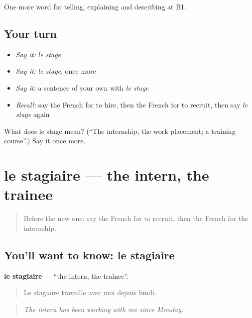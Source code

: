 \begin{grammarlens}[title={What you've built}]
One more word for telling, explaining and describing at B1.
\end{grammarlens}

\subsection*{Your turn}
\begin{itemize}
\raggedright
  \item \emph{Say it:} \emph{le stage}
  \item \emph{Say it:} \emph{le stage}, once more
  \item \emph{Say it:} a sentence of your own with \emph{le stage}
  \item \emph{Recall:} say the French for to hire, then the French for to recruit, then say \emph{le stage} again
\end{itemize}

\begin{tcolorbox}[breakable,colback=teal!4,colframe=teal!35!black,title={Before you move on}]
What does le stage mean? (\textquotedblleft{}The internship, the work placement; a training course\textquotedblright{}.) Say it once more.
\end{tcolorbox}
\section[le stagiaire]{le stagiaire — the intern, the trainee}

\label{lesson:FR-C357-stagiaire}



\begin{quote}
Before the new one: say the French for to recruit, then the French for the internship.
\end{quote}

\subsection*{You'll want to know: le stagiaire}
\textbf{le stagiaire} — \textquotedblleft{}the intern, the trainee\textquotedblright{}.

\begin{quote}
Le stagiaire travaille avec moi depuis lundi.
\end{quote}

\begin{quote}
\emph{The intern has been working with me since Monday.}
\end{quote}

